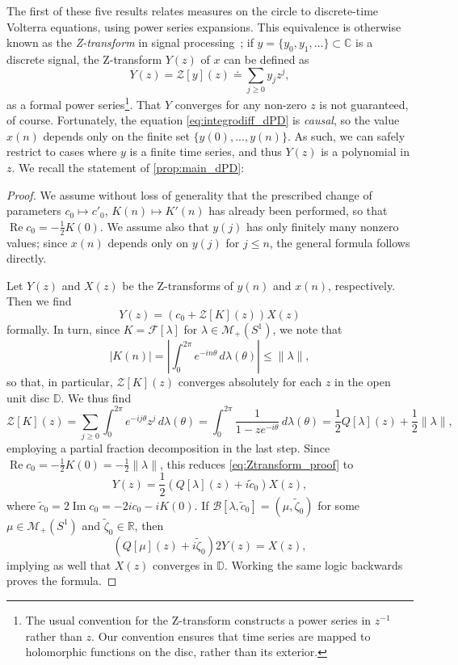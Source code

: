 \documentclass{cams-l} %
\newcommand{\dave}[1]{#1}\newcommand{\davebegin}{}\newcommand{\daveend}{}\newcommand{\george}[1]{#1}
\newcommand{\CC}{\mathbb C}
\newcommand{\RR}{\mathbb R}
\newcommand{\DD}{\mathbb D}
\newcommand{\cM}{\mathcal M}
\newcommand{\cB}{\mathcal B}
\newcommand{\cF}{\mathcal F}
\newcommand{\cZ}{\mathcal Z}
\newcommand{\op}{\operatorname}
\renewcommand{\Re}{\op{Re}}
\renewcommand{\Im}{\op{Im}}
\theoremstyle{definition}
\theoremstyle{remark}
\numberwithin{equation}{section}
\begin{document}
The first of these five results relates measures on the circle to discrete-time Volterra equations, using power series expansions. This equivalence is otherwise known as the \emph{Z-transform} in signal processing~\cite{bhattacharyya2018handbook}; if $y= \{y_0,y_1,...\}\subset\CC$ is a discrete signal, the Z-transform $Y(z)$ of $x$ can be defined as
\[Y(z) = \cZ[y](z) \doteq \sum_{j\geq 0} y_j z^j,\]
as a formal power series\footnote{The usual convention for the Z-transform constructs a power series in $z^{-1}$ rather than $z$. Our convention ensures that time series are mapped to holomorphic functions on the disc, rather than its exterior.}. That $Y$ converges for any non-zero $z$ is not guaranteed, of course. Fortunately, the equation \ref{eq:integrodiff_dPD} is \emph{causal}, so the value $x(n)$ depends only on the finite set $\{y(0),...,y(n)\}$. As such, we can safely restrict to cases where $y$ is a finite time series, and thus $Y(z)$ is a polynomial in $z$. We recall the statement of \cref{prop:main_dPD}:
\propmaindPD*
\begin{proof}
    We assume without loss of generality that the prescribed change of parameters $c_0\mapsto c'_0$, $K(n)\mapsto K'(n)$ has already been performed, so that $\Re c_0 = -\frac{1}{2}K(0)$. We assume also that $y(j)$ has only finitely many nonzero values; since $x(n)$ depends only on $y(j)$ for $j\leq n$, the general formula follows directly.
    
    Let $Y(z)$ and $X(z)$ be the Z-transforms of $y(n)$ and $x(n)$, respectively. Then we find
    \begin{equation}\label{eq:Ztransform_proof}
        Y(z) = \left(c_0 + \cZ[K](z)\right)X(z)
    \end{equation}
    formally. In turn, since $K = \cF[\lambda]$ for $\lambda\in\cM_+(S^1)$, we note that
    \[|K(n)| = \left|\int_0^{2\pi} e^{-in\theta}\,d\lambda(\theta)\right| \leq \|\lambda\|,\]
    so that, in particular, $\cZ[K](z)$ converges absolutely for each $z$ in the open unit disc $\DD$. We thus find
    \[\cZ[K](z) = \sum_{j\geq 0}\int_0^{2\pi} e^{-ij\theta}z^j\,d\lambda(\theta) = \int_0^{2\pi}\frac{1}{1-ze^{-i\theta}}\,d\lambda(\theta) = \frac{1}{2}Q[\lambda](z) + \frac{1}{2}\|\lambda\|,\]
    employing \dave{a partial fraction decomposition} in the last step. Since $\Re c_0 = -\frac{1}{2}K(0) = -\frac{1}{2}\|\lambda\|$, this reduces \cref{eq:Ztransform_proof} to
    \[Y(z) = \frac{1}{2}\left(Q[\lambda](z) + i\widetilde{c}_0\right)X(z),\]
    where $\widetilde{c}_0 = 2\Im c_0 = -2ic_0 - iK(0)$. If $\cB[\lambda,\widetilde{c}_0] = (\mu,\widetilde{\zeta}_0)$ for some $\mu\in\cM_+(S^1)$ and $\widetilde{\zeta}_0\in\RR$, then
    \[\left(Q[\mu](z) + i\widetilde{\zeta}_0\right) 2Y(z) = X(z),\]
    implying as well that $X(z)$ converges in $\DD$. Working the same logic backwards proves the formula.
\end{proof}
\end{document}
